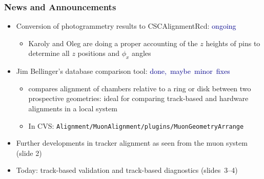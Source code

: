 \documentclass[compress]{beamer}
\begin{document}

\small

\begin{frame}
\frametitle{News and Announcements}
\begin{itemize}\setlength{\itemsep}{0.35 cm}
\item Conversion of photogrammetry results to CSCAlignmentRcd: \mbox{\textcolor{darkblue}{ongoing}\hspace{-1 cm}}
\begin{itemize}
\item Karoly and Oleg are doing a proper accounting of the $z$ heights
  of pins to determine all $z$ positions and $\phi_x$ angles
\end{itemize}

\item Jim Bellinger's database comparison tool: \mbox{\textcolor{darkblue}{done, maybe minor fixes}\hspace{-1 cm}}
\begin{itemize}
\item compares alignment of chambers relative to a ring or disk
  between two prospective geometries: ideal for comparing track-based
  and hardware alignments in a local system
\item In CVS: \mbox{\tt \scriptsize Alignment/MuonAlignment/plugins/MuonGeometryArrange\hspace{-1 cm}}
\end{itemize}

\item Further developments in tracker alignment as seen from the muon
  system (slide 2)

\item Today: track-based validation and track-based diagnostics \mbox{(slides 3--4)\hspace{-1 cm}}

\end{itemize}
\end{frame}
\end{document}
